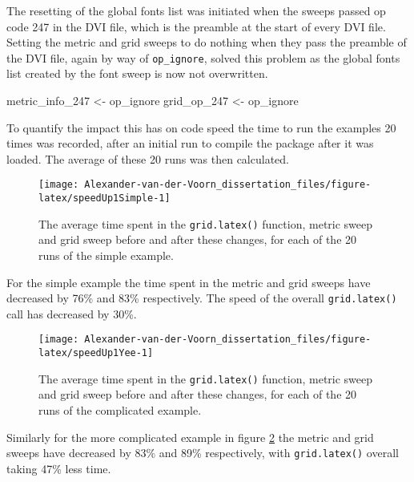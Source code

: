 \documentclass[]{article}
\newenvironment{Shaded}{\begin{snugshade}}{\end{snugshade}}
\newcommand{\DecValTok}[1]{\textcolor[rgb]{0.00,0.00,0.81}{#1}}
\newcommand{\StringTok}[1]{\textcolor[rgb]{0.31,0.60,0.02}{#1}}
\newcommand{\NormalTok}[1]{#1}
\begin{document}
The resetting of the global fonts list was initiated when the sweeps
passed op code 247 in the DVI file, which is the preamble at the start
of every DVI file. Setting the metric and grid sweeps to do nothing when
they pass the preamble of the DVI file, again by way of
\texttt{op\_ignore}, solved this problem as the global fonts list
created by the font sweep is now not overwritten.

\begin{Shaded}
\begin{Highlighting}[]
\NormalTok{metric_info_}\DecValTok{247}\NormalTok{ <-}\StringTok{ }\NormalTok{op_ignore}
\NormalTok{grid_op_}\DecValTok{247}\NormalTok{ <-}\StringTok{ }\NormalTok{op_ignore}
\end{Highlighting}
\end{Shaded}

To quantify the impact this has on code speed the time to run the
examples 20 times was recorded, after an initial run to compile the
package after it was loaded. The average of these 20 runs was then
calculated.

\begin{figure}

{\centering \texttt{[image: Alexander-van-der-Voorn\_dissertation\_files/figure-latex/speedUp1Simple-1]} 

}

\caption{The average time spent in the \texttt{grid.latex()} function, metric sweep and grid sweep before and after these changes, for each of the 20 runs of the simple example.}\label{fig:speedUp1Simple}
\end{figure}

For the simple example the time spent in the metric and grid sweeps have
decreased by 76\% and 83\% respectively. The speed of the overall
\texttt{grid.latex()} call has decreased by 30\%.

\begin{figure}

{\centering \texttt{[image: Alexander-van-der-Voorn\_dissertation\_files/figure-latex/speedUp1Yee-1]} 

}

\caption{The average time spent in the \texttt{grid.latex()} function, metric sweep and grid sweep before and after these changes, for each of the 20 runs of the complicated example.}\label{fig:speedUp1Yee}
\end{figure}

Similarly for the more complicated example in figure
\ref{fig:speedUp1Yee} the metric and grid sweeps have decreased by 83\%
and 89\% respectively, with \texttt{grid.latex()} overall taking 47\%
less time.
\end{document}
